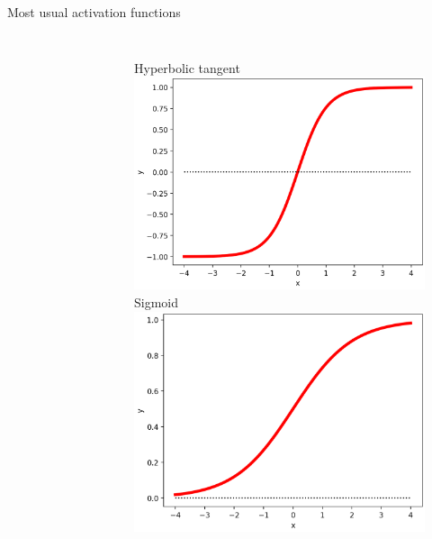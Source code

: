 \documentclass[handout]{beamer}
\begin{document}
\begin{frame}{Most usual activation functions}
\begin{columns}
\begin{figure}
    \end{figure}
    \begin{figure}
     \centering
        Hyperbolic tangent\\
        \includegraphics[width=.85\textwidth]{fig/L2/activ-tanh.png}\\
       Sigmoid\\
        \includegraphics[width=.85\textwidth]{fig/L2/activ-sigmoid.png}\\

    \end{figure}
\end{columns}
\end{frame}
\end{document}

